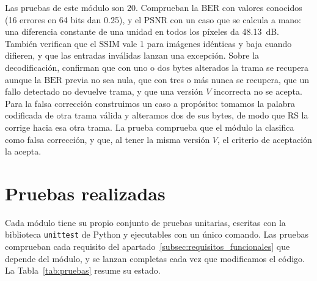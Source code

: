 \documentclass[IB]{TFUOC}%
\begin{document}
Las pruebas de este módulo son 20. Comprueban la $\mathrm{BER}$ con valores 
conocidos (16 errores en 64 bits dan 0{.}25), y el $\mathrm{PSNR}$ con un caso que se calcula a 
mano: una diferencia constante de una unidad en todos los píxeles da 48{.}13~dB. También verifican 
que el $\mathrm{SSIM}$ vale 1 para imágenes idénticas y baja cuando difieren, y que las entradas 
inválidas lanzan una excepción. Sobre la decodificación, confirman que con uno o dos bytes 
alterados la trama se recupera aunque la $\mathrm{BER}$ previa no sea nula, que con tres o más 
nunca se recupera, que un fallo detectado no devuelve trama, y que una versión $V$ incorrecta no 
se acepta. Para la falsa corrección construimos un caso a propósito: tomamos la palabra codificada 
de otra trama válida y alteramos dos de sus bytes, de modo que RS la corrige hacia esa otra trama. 
La prueba comprueba que el módulo la clasifica como falsa corrección, y que, al tener la misma 
versión $V$, el criterio de aceptación la acepta.


\section{Pruebas realizadas}
\label{sec:pruebas}

Cada módulo tiene su propio conjunto de pruebas unitarias, escritas con la biblioteca \texttt{unittest} de Python y ejecutables con un único comando. Las pruebas comprueban cada requisito del apartado~\ref{subsec:requisitos_funcionales} que depende del módulo, y se lanzan completas cada vez que modificamos el código. La Tabla~\ref{tab:pruebas} resume su estado.
\end{document}
